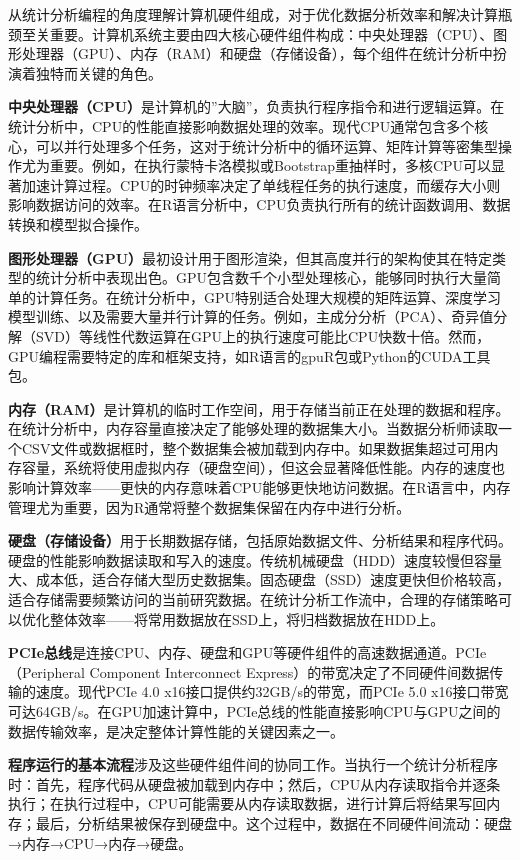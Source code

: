 \documentclass[
  twoside]{book}
\begin{document}
从统计分析编程的角度理解计算机硬件组成，对于优化数据分析效率和解决计算瓶颈至关重要。计算机系统主要由四大核心硬件组件构成：中央处理器（CPU）、图形处理器（GPU）、内存（RAM）和硬盘（存储设备），每个组件在统计分析中扮演着独特而关键的角色。

\textbf{中央处理器（CPU）}是计算机的''大脑''，负责执行程序指令和进行逻辑运算。在统计分析中，CPU的性能直接影响数据处理的效率。现代CPU通常包含多个核心，可以并行处理多个任务，这对于统计分析中的循环运算、矩阵计算等密集型操作尤为重要。例如，在执行蒙特卡洛模拟或Bootstrap重抽样时，多核CPU可以显著加速计算过程。CPU的时钟频率决定了单线程任务的执行速度，而缓存大小则影响数据访问的效率。在R语言分析中，CPU负责执行所有的统计函数调用、数据转换和模型拟合操作。

\textbf{图形处理器（GPU）}最初设计用于图形渲染，但其高度并行的架构使其在特定类型的统计分析中表现出色。GPU包含数千个小型处理核心，能够同时执行大量简单的计算任务。在统计分析中，GPU特别适合处理大规模的矩阵运算、深度学习模型训练、以及需要大量并行计算的任务。例如，主成分分析（PCA）、奇异值分解（SVD）等线性代数运算在GPU上的执行速度可能比CPU快数十倍。然而，GPU编程需要特定的库和框架支持，如R语言的gpuR包或Python的CUDA工具包。

\textbf{内存（RAM）}是计算机的临时工作空间，用于存储当前正在处理的数据和程序。在统计分析中，内存容量直接决定了能够处理的数据集大小。当数据分析师读取一个CSV文件或数据框时，整个数据集会被加载到内存中。如果数据集超过可用内存容量，系统将使用虚拟内存（硬盘空间），但这会显著降低性能。内存的速度也影响计算效率------更快的内存意味着CPU能够更快地访问数据。在R语言中，内存管理尤为重要，因为R通常将整个数据集保留在内存中进行分析。

\textbf{硬盘（存储设备）}用于长期数据存储，包括原始数据文件、分析结果和程序代码。硬盘的性能影响数据读取和写入的速度。传统机械硬盘（HDD）速度较慢但容量大、成本低，适合存储大型历史数据集。固态硬盘（SSD）速度更快但价格较高，适合存储需要频繁访问的当前研究数据。在统计分析工作流中，合理的存储策略可以优化整体效率------将常用数据放在SSD上，将归档数据放在HDD上。

\textbf{PCIe总线}是连接CPU、内存、硬盘和GPU等硬件组件的高速数据通道。PCIe（Peripheral Component Interconnect Express）的带宽决定了不同硬件间数据传输的速度。现代PCIe 4.0 x16接口提供约32GB/s的带宽，而PCIe 5.0 x16接口带宽可达64GB/s。在GPU加速计算中，PCIe总线的性能直接影响CPU与GPU之间的数据传输效率，是决定整体计算性能的关键因素之一。

\textbf{程序运行的基本流程}涉及这些硬件组件间的协同工作。当执行一个统计分析程序时：首先，程序代码从硬盘被加载到内存中；然后，CPU从内存读取指令并逐条执行；在执行过程中，CPU可能需要从内存读取数据，进行计算后将结果写回内存；最后，分析结果被保存到硬盘中。这个过程中，数据在不同硬件间流动：硬盘→内存→CPU→内存→硬盘。
\end{document}
